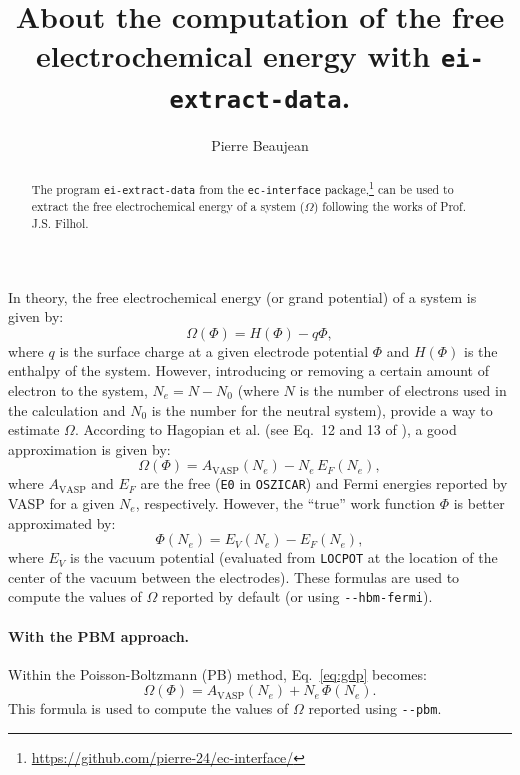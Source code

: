 \documentclass[12pt,a4paper]{article}
\title{About the computation of the free electrochemical energy with \texttt{ei-extract-data}.}
\author{Pierre Beaujean}
\begin{document}
	\maketitle
	
	\begin{abstract}
		The program \texttt{ei-extract-data} from the \texttt{ec-interface} package,\footnote{\url{https://github.com/pierre-24/ec-interface/}} can be used to extract the free electrochemical energy of a system ($\Omega$) following the works of Prof. J.S. Filhol. 
	\end{abstract}
	
	In theory, the free electrochemical energy (or grand potential) of a system is given by:\begin{equation}
		\Omega(\Phi) = H(\Phi) - q\Phi,\label{eq:gdp}
	\end{equation}
	where $q$ is the surface charge at a given electrode potential $\Phi$ and $H(\Phi)$ is the enthalpy of the system. However, introducing or removing a certain amount of electron to the system, $N_e = N - N_0$ (where $N$ is the number of electrons used in the calculation and $N_0$ is the number for the neutral system), provide a way to estimate $\Omega$. According to Hagopian et al. (see Eq.~12 and 13 of \cite{hagopianAdvancementHomogeneousBackground2022}), a good approximation is given by:\begin{equation}
		\Omega(\Phi) = A_{\text{VASP}}(N_e) - N_e\,E_F(N_e),\label{eq:gdp-fermi}
	\end{equation} 
	where $A_{\text{VASP}}$ and $E_F$ are the free (\texttt{E0} in \texttt{OSZICAR}) and Fermi energies reported by VASP for a given $N_e$, respectively. However, the ``true'' work function $\Phi$ is better approximated by:\begin{equation}
		\Phi(N_e) = E_V(N_e)-E_F(N_e),\label{eq:phi}
	\end{equation} 
	where $E_V$ is the vacuum potential (evaluated from \texttt{LOCPOT} at the location of the center of the vacuum between the electrodes). These formulas are used to compute the values of $\Omega$ reported by default (or using \texttt{\lstinline|--hbm-fermi|}).
	
	\paragraph{With the PBM approach.} Within the Poisson-Boltzmann (PB) method, Eq.~\eqref{eq:gdp} becomes:\begin{equation}
		\Omega(\Phi) = A_{\text{VASP}}(N_e) + N_e\,\Phi(N_e). \label{eq:gdp-pbm}
	\end{equation}
	This formula is used to compute the values of $\Omega$ reported using  \texttt{\lstinline|--pbm|}.
	
\end{document}
